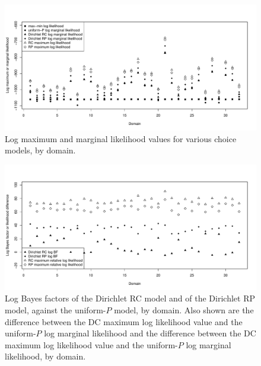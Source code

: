 \documentclass[11pt,letter]{article}
\newcommand{\Dpi}{Dirichlet RP model}
\newcommand{\DP}{Dirichlet RC model}
\begin{document}
\begin{figure}
  \centering
  \includegraphics[width=\textwidth]{figures/max_mar_like.pdf}
  \caption{Log maximum and marginal likelihood values for various choice models, by domain.}
  \label{f:max_mar_like}
\end{figure}

\begin{figure}
  \centering
  \includegraphics[width=\textwidth]{figures/BF.pdf}
  \caption{Log Bayes factors of the \DP{} and of the \Dpi{}, against the uniform-$P$ model, by domain. Also shown are the difference between the DC maximum log likelihood value and the uniform-$P$ log marginal likelihood and the difference between the DC maximum log likelihood value and the uniform-$P$ log marginal likelihood, by domain.}
  \label{f:BF}
\end{figure}
\end{document}
